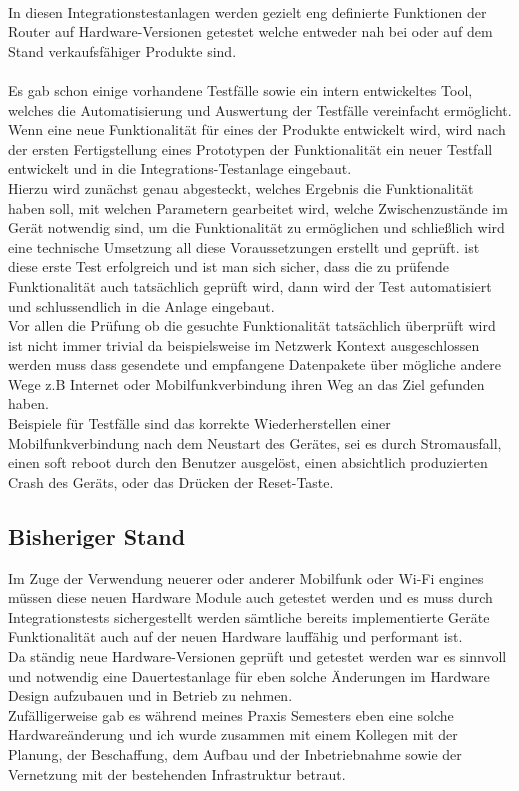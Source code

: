  \\
 In diesen Integrationstestanlagen werden gezielt eng definierte Funktionen der Router auf  Hardware-Versionen getestet welche entweder nah bei oder auf dem Stand verkaufsfähiger Produkte sind.  \\
\\
Es gab schon einige vorhandene Testfälle sowie ein intern entwickeltes Tool, welches die Automatisierung und Auswertung der Testfälle vereinfacht ermöglicht. 
Wenn eine neue Funktionalität für eines der Produkte entwickelt wird, wird nach der ersten Fertigstellung eines Prototypen der Funktionalität ein neuer Testfall entwickelt und in die Integrations-Testanlage eingebaut.  \\
Hierzu wird zunächst genau abgesteckt, welches Ergebnis die Funktionalität haben soll, mit welchen Parametern gearbeitet wird, welche Zwischenzustände im Gerät notwendig sind, um die Funktionalität zu ermöglichen und schließlich wird eine technische Umsetzung all diese Voraussetzungen erstellt und geprüft. ist diese erste Test erfolgreich und ist man sich sicher, dass die zu prüfende Funktionalität auch tatsächlich geprüft wird, dann wird  der Test automatisiert und schlussendlich in die Anlage eingebaut. \\
Vor  allen  die Prüfung ob die gesuchte Funktionalität tatsächlich überprüft wird ist nicht immer trivial da beispielsweise im Netzwerk Kontext ausgeschlossen werden muss dass gesendete und empfangene Datenpakete über mögliche andere Wege z.B Internet oder Mobilfunkverbindung ihren Weg an das Ziel gefunden haben.\\
Beispiele für Testfälle sind das korrekte Wiederherstellen einer Mobilfunkverbindung nach dem Neustart des Gerätes, sei es durch Stromausfall, einen soft reboot durch den Benutzer ausgelöst, einen absichtlich produzierten Crash des Geräts, oder das Drücken der Reset-Taste. \\
\subsection{Bisheriger Stand}
Im Zuge der Verwendung  neuerer oder anderer Mobilfunk oder Wi-Fi engines müssen diese neuen Hardware Module auch getestet werden und es muss  durch Integrationstests sichergestellt werden sämtliche bereits implementierte Geräte Funktionalität auch auf der neuen Hardware lauffähig und performant ist.   \\
Da ständig neue Hardware-Versionen geprüft und getestet werden war es sinnvoll und notwendig eine  Dauertestanlage für eben solche Änderungen im Hardware Design  aufzubauen und in Betrieb zu nehmen. \\
Zufälligerweise gab es während meines Praxis Semesters eben eine solche Hardwareänderung und ich wurde zusammen mit einem Kollegen mit der Planung, der Beschaffung, dem Aufbau und der Inbetriebnahme sowie der Vernetzung mit der bestehenden Infrastruktur betraut. \\

